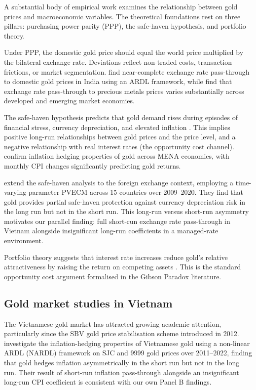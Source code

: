 \documentclass[12pt,a4paper]{article}
\begin{document}
A substantial body of empirical work examines the relationship between gold
prices and macroeconomic variables. The theoretical foundations rest on
three pillars: purchasing power parity (PPP), the safe-haven hypothesis,
and portfolio theory.

Under PPP, the domestic gold price should equal the world price multiplied
by the bilateral exchange rate. Deviations reflect non-traded costs,
transaction frictions, or market segmentation. \citet{sahu2022} find
near-complete exchange rate pass-through to domestic gold prices in India
using an ARDL framework, while \citet{rana2023} find that exchange rate
pass-through to precious metals prices varies substantially across
developed and emerging market economies.

The safe-haven hypothesis predicts that gold demand rises during episodes
of financial stress, currency depreciation, and elevated inflation
\citep{baur2010}. This implies positive long-run relationships between
gold prices and the price level, and a negative relationship with real
interest rates (the opportunity cost channel).
\citet{derbali2021} confirm inflation hedging properties of gold across
MENA economies, with monthly CPI changes significantly predicting gold
returns.

\citet{wang2021} extend the safe-haven analysis to the foreign exchange
context, employing a time-varying parameter PVECM across 15 countries
over 2009--2020. They find that gold provides partial safe-haven protection
against currency depreciation risk in the long run but not in the short run.
This long-run versus short-run asymmetry motivates our parallel finding:
full short-run exchange rate pass-through in Vietnam alongside insignificant
long-run coefficients in a managed-rate environment.

Portfolio theory suggests that interest rate increases reduce gold's relative
attractiveness by raising the return on competing assets
\citep{hammoudeh2010}. This is the standard opportunity cost argument
formalised in the Gibson Paradox literature.

\subsection{Gold market studies in Vietnam}

The Vietnamese gold market has attracted growing academic attention,
particularly since the SBV gold price stabilisation scheme introduced
in 2012. \citet{do2023} investigate the inflation-hedging properties of Vietnamese
gold using a non-linear ARDL (NARDL) framework on SJC and 9999 gold prices
over 2011--2022, finding that gold hedges inflation asymmetrically in the
short run but not in the long run. Their result of short-run inflation
pass-through alongside an insignificant long-run CPI coefficient is
consistent with our own Panel B findings.
\end{document}
